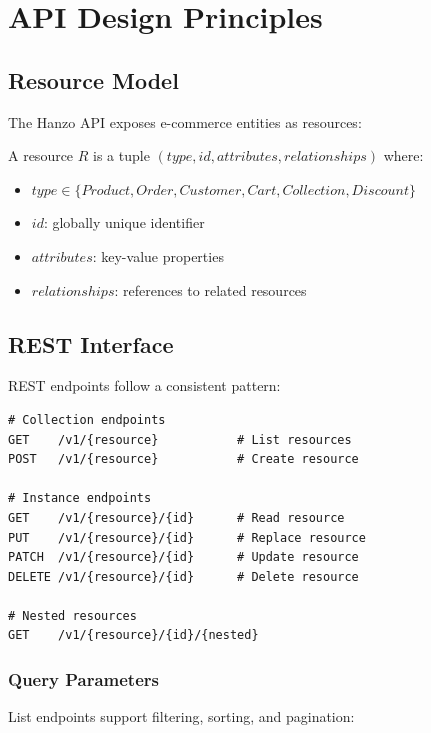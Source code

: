 \section{API Design Principles}


\subsection{Resource Model}

The Hanzo API exposes e-commerce entities as resources:

\begin{definition}
A resource $R$ is a tuple $(type, id, attributes, relationships)$ where:
\begin{itemize}
    \item $type \in \{Product, Order, Customer, Cart, Collection, Discount\}$
    \item $id$: globally unique identifier
    \item $attributes$: key-value properties
    \item $relationships$: references to related resources
\end{itemize}
\end{definition}

\subsection{REST Interface}

REST endpoints follow a consistent pattern:

\begin{lstlisting}[caption=REST Endpoint Structure]
# Collection endpoints
GET    /v1/{resource}           # List resources
POST   /v1/{resource}           # Create resource

# Instance endpoints
GET    /v1/{resource}/{id}      # Read resource
PUT    /v1/{resource}/{id}      # Replace resource
PATCH  /v1/{resource}/{id}      # Update resource
DELETE /v1/{resource}/{id}      # Delete resource

# Nested resources
GET    /v1/{resource}/{id}/{nested}
\end{lstlisting}

\subsubsection{Query Parameters}

List endpoints support filtering, sorting, and pagination:

